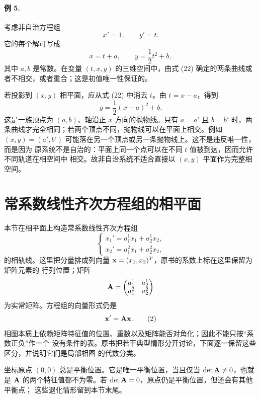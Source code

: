 \paragraph{例 5.}
考虑非自治方程组
\[
 x'=1,\qquad y'=t.
\]
它的每个解可写成
\begin{equation}
 x=t+a,\qquad y=\frac12t^2+b,
 \tag{22}
\end{equation}
其中 \(a,b\) 是常数。在变量 \((t,x,y)\) 的三维空间中，由式 (22)
确定的两条曲线或者不相交，或者重合；这是初值唯一性保证的。

若投影到 \((x,y)\) 相平面，应从式 (22) 中消去 \(t\)。由
\(t=x-a\)，得到
\[
 y=\frac12(x-a)^2+b.
\]
这是一族顶点为 \((a,b)\)、轴沿正 \(x\) 方向的抛物线。只有 \(a=a'\) 且 \(b=b'\)
时，两条曲线才完全相同；若两个顶点不同，抛物线可以在平面上相交。例如
\((x,y)=(a',b')\) 可能落在另一个顶点或另一条抛物线上。这不是违反唯一性，而是因为
原系统不是自治的：平面上同一个点可以在不同 \(t\) 值被到达，因而允许不同轨道在相空间中
相交。故非自治系统不适合直接以 \((x,y)\) 平面作为完整相空间。

\section{常系数线性齐次方程组的相平面}

本节在相平面上构造常系数线性齐次方程组
\begin{equation}
 \begin{cases}
  x_1'=a_1^1x_1+a_2^1x_2,\\
  x_2'=a_1^2x_1+a_2^2x_2,
 \end{cases}
 \tag{1}
\end{equation}
的相轨线。这里把分量排成列向量 \(\vect{x}=(x_1,x_2)^T\)，原书的系数上标在这里保留为矩阵元素的
行列位置；矩阵
\[
 \mathbf{A}=
 \begin{pmatrix}
  a_1^1&a_2^1\\
  a_1^2&a_2^2
 \end{pmatrix}
\]
为实常矩阵。方程组的向量形式仍是
\begin{equation}
 \vect{x}'=\mat{A}\vect{x}.
 \tag{2}
\end{equation}
相图本质上依赖矩阵特征值的位置、重数以及矩阵能否对角化；因此不能只按“系数正负”作一个
没有条件的表。原书把若干典型情形分开讨论，下面逐一保留这些区分，并说明它们是局部相图
的代数分类。

坐标原点 \((0,0)\) 总是平衡位置。它是唯一平衡位置，当且仅当 \(\det \mathbf{A}\neq0\)，也就是
\(\mathbf{A}\) 的两个特征值都不为零。若 \(\det \mathbf{A}=0\)，原点仍是平衡位置，但还会有其他平衡点；
这些退化情形留到本节末尾。


